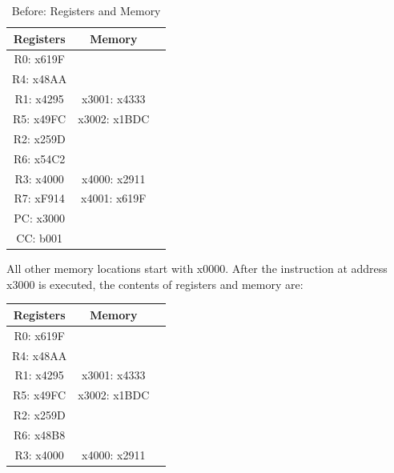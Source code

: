 \documentclass{article}
\begin{document}
\begin{enumerate}[label=(\alph*)]
\begin{enumerate}[label=(\alph*)]
\begin{enumerate}[label=(\roman*)]
            \begin{table}[h]
            \centering
            \begin{tabular}{|c|c|c|}
            \hline
            \textbf{Registers} & \textbf{Memory} & \\
            \hline
            R0: x619F & & \\
            \hline
            R4: x48AA & & \\
            \hline
            R1: x4295 & x3001: x4333 & \\
            \hline
            R5: x49FC & x3002: x1BDC & \\
            \hline
            R2: x259D & & \\
            \hline
            R6: x54C2 & & \\
            \hline
            R3: x4000 & x4000: x2911 & \\
            \hline
            R7: xF914 & x4001: x619F & \\
            \hline
            PC: x3000 & & \\
            \hline
            CC: b001 & & \\
            \hline
            \end{tabular}
            \caption{Before: Registers and Memory}
            \label{tab:before}
            \end{table}
            \newline
            All other memory locations start with x0000. After the instruction at address x3000 is executed, the contents of registers and memory are:
            \begin{table}[h]
            \centering
            \begin{tabular}{|c|c|c|}
            \hline
            \textbf{Registers} & \textbf{Memory} & \\
            \hline
            R0: x619F & & \\
            \hline
            R4: x48AA & & \\
            \hline
            R1: x4295 & x3001: x4333 & \\
            \hline
            R5: x49FC & x3002: x1BDC & \\
            \hline
            R2: x259D & & \\
            \hline
            R6: x48B8 & & \\
            \hline
            R3: x4000 & x4000: x2911 & \\
            \hline

\end{tabular}
\end{table}
\end{enumerate}
\end{enumerate}
\end{enumerate}
\end{document}

